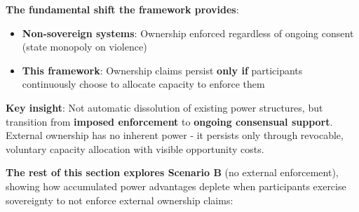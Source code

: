\documentclass[11pt,a4paper]{article}
\theoremstyle{definition}
\theoremstyle{remark}
\begin{document}
\medskip

\textbf{The fundamental shift the framework provides}:
\begin{itemize}
\item \textbf{Non-sovereign systems}: Ownership enforced regardless of ongoing consent (state monopoly on violence)
\item \textbf{This framework}: Ownership claims persist \textbf{only if} participants continuously choose to allocate capacity to enforce them
\end{itemize}

\textbf{Key insight}: Not automatic dissolution of existing power structures, but transition from \textbf{imposed enforcement} to \textbf{ongoing consensual support}. External ownership has no inherent power - it persists only through revocable, voluntary capacity allocation with visible opportunity costs.

\medskip

\textbf{The rest of this section explores Scenario B} (no external enforcement), showing how accumulated power advantages deplete when participants exercise sovereignty to not enforce external ownership claims:
\end{document}
